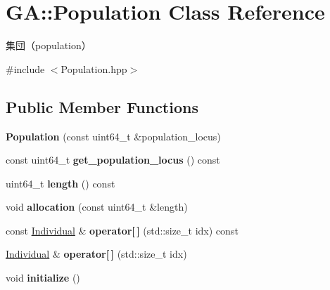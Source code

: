 \hypertarget{class_g_a_1_1_population}{}\section{GA\+::Population Class Reference}
\label{class_g_a_1_1_population}


集団（population）  




{\ttfamily \#include $<$Population.\+hpp$>$}

\subsection*{Public Member Functions}
\begin{DoxyCompactItemize}
\item 
\mbox{\label{class_g_a_1_1_population_a6ebc73e0c16b36463ea2834fb5dc53e7}} 
{\bfseries Population} (const uint64\+\_\+t \&population\+\_\+locus)
\item 
\mbox{\label{class_g_a_1_1_population_a8dcdd839cb17b00327bed382207dcc87}} 
const uint64\+\_\+t {\bfseries get\+\_\+population\+\_\+locus} () const
\item 
\mbox{\label{class_g_a_1_1_population_a33cbabc8b461b7d0486dba2c064ee005}} 
uint64\+\_\+t {\bfseries length} () const
\item 
\mbox{\label{class_g_a_1_1_population_af054c634ff6cff4b3187649f9c4e7357}} 
void {\bfseries allocation} (const uint64\+\_\+t \&length)
\item 
\mbox{\label{class_g_a_1_1_population_a46544410b015c010b0d37fabb7bdcfc5}} 
const \mbox{\hyperlink{class_g_a_1_1_individual}{Individual}} \& {\bfseries operator\mbox{[}$\,$\mbox{]}} (std\+::size\+\_\+t idx) const
\item 
\mbox{\label{class_g_a_1_1_population_a852598da7700c4f2598aba5b7f0d9bcf}} 
\mbox{\hyperlink{class_g_a_1_1_individual}{Individual}} \& {\bfseries operator\mbox{[}$\,$\mbox{]}} (std\+::size\+\_\+t idx)
\item 
\mbox{\label{class_g_a_1_1_population_a97ec98c0cb6fdc4661a02c0b41850b7f}} 
void {\bfseries initialize} ()
\end{DoxyCompactItemize}
